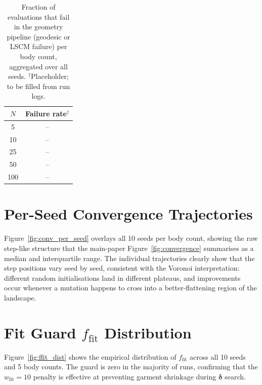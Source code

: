 \documentclass[runningheads]{llncs}
\begin{document}
\begin{table}[h]
\centering
\caption{Fraction of evaluations that fail in the geometry pipeline
(geodesic or LSCM failure) per body count, aggregated over all seeds.
$^\dagger$Placeholder; to be filled from run logs.}
\label{tab:failures}
\begin{tabular}{cc}
\toprule
$N$ & Failure rate$^\dagger$ \\
\midrule
5    & -- \\
10   & -- \\
25   & -- \\
50   & -- \\
100  & -- \\
\bottomrule
\end{tabular}
\end{table}

\section{Per-Seed Convergence Trajectories}
\label{sup:convergence}

Figure~\ref{fig:conv_per_seed} overlays all 10 seeds per body count,
showing the raw step-like structure that the main-paper
Figure~\ref{fig:convergence} summarises as a median and interquartile
range. The individual trajectories clearly show that the step positions
vary seed by seed, consistent with the Voronoi interpretation:
different random initialisations land in different plateaus, and
improvements occur whenever a mutation happens to cross into a
better-flattening region of the landscape.


\section{Fit Guard $f_\text{fit}$ Distribution}
\label{sup:ffit}

Figure~\ref{fig:ffit_dist} shows the empirical distribution of
$f_\text{fit}$ across all 10 seeds and 5 body counts. The guard is
zero in the majority of runs, confirming that the $w_\text{fit}=10$
penalty is effective at preventing garment shrinkage during
$\boldsymbol{\delta}$ search.
\end{document}
